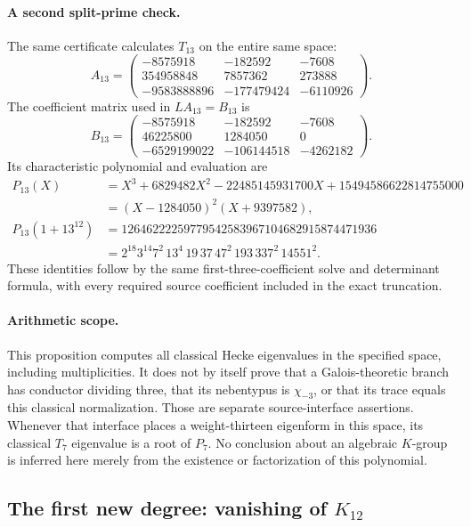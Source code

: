 \documentclass[11pt,a4paper]{article}
\theoremstyle{definition}
\begin{document}
\paragraph{A second split-prime check.}
The same certificate calculates $T_{13}$ on the entire same space:
\[
 A_{13}=
 \begin{pmatrix}
 -8575918&-182592&-7608\\
 354958848&7857362&273888\\
 -9583888896&-177479424&-6110926
 \end{pmatrix}.
\]
The coefficient matrix used in $LA_{13}=B_{13}$ is
\[
 B_{13}=
 \begin{pmatrix}
 -8575918&-182592&-7608\\
 46225800&1284050&0\\
 -6529199022&-106144518&-4262182
 \end{pmatrix}.
\]
Its characteristic polynomial and evaluation are
\begin{align*}
 P_{13}(X)
 &=X^3+6829482X^2-22485145931700X+15494586622814755000\\
 &=(X-1284050)^2(X+9397582),\\
 P_{13}(1+13^{12})
 &=12646222259779542583967104682915874471936\\
 &=2^{18}3^{14}7^2\,13^4\,19\,37\,47^2\,193\,337^2\,14551^2.
\end{align*}
These identities follow by the same first-three-coefficient solve and
determinant formula, with every required source coefficient included in
the exact truncation.

\paragraph{Arithmetic scope.}
This proposition computes all classical Hecke eigenvalues in the
specified space, including multiplicities. It does not by itself prove
that a Galois-theoretic branch has conductor dividing three, that its
nebentypus is $\chi_{-3}$, or that its trace equals this classical
normalization. Those are separate source-interface assertions. Whenever
that interface places a weight-thirteen eigenform in this space,
its classical $T_7$ eigenvalue is a root of $P_7$.
No conclusion about an algebraic $K$-group is inferred here merely from
the existence or factorization of this polynomial.

\subsection{The first new degree: vanishing of \texorpdfstring{$K_{12}$}{K12}}
\label{sec:k12-hecke-vanishing}
\end{document}
